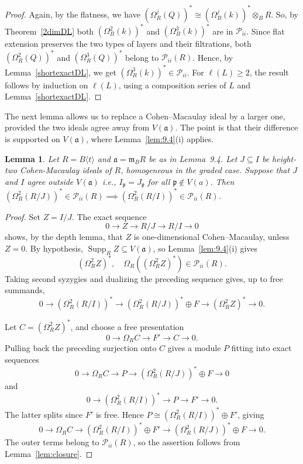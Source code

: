 \documentclass[11pt,letterpaper]{amsart}
\theoremstyle{plain}
\newtheorem{lem}[thm]{Lemma}
\theoremstyle{definition}
\theoremstyle{remark}
\begin{document}
\begin{proof}
Again, by the flatness, we have $(\Omega_R^j(Q))^* \cong(\Omega_B^j(k))^*\otimes_B R$. So, by Theorem~\ref{2dimDL} both $(\Omega_B^2(k))^*$ and $(\Omega^3_B(k))^*$ are in $\mathcal{P}_{ii}$. Since flat extension preserves the two types of layers and their filtrations, both $(\Omega_R^2(Q))^*$ and $(\Omega_R^3(Q))^*$ belong to $\mathcal P_{ii}(R)$. Hence, by Lemma~\ref{shortexactDL}, we get $(\Omega^3_R(k))^*\in\mathcal{P}_{ii}$. For $\ell(L)\geq 2$, the result follows by induction on $\ell(L)$, using a composition series of $L$ and Lemma~\ref{shortexactDL}.
\end{proof}


The next lemma allows us to replace a Cohen--Macaulay
ideal by a larger one, provided the two ideals agree
away from $V(\mathfrak a)$. The point is that their
difference is supported on $V(\mathfrak a)$, where
Lemma~\ref{lem:9.4}(i) applies.

\begin{lem}\label{lem:passing-to-larger-ideal}
Let $R=B\langle t\rangle$ and $\mathfrak a=\mathfrak m_B R$ be as in Lemma~9.4. Let $J\subseteq I$ be height-two Cohen-Macaulay ideals of $R$, homogeneous in the graded case. Suppose that $J$ and $I$ agree outside $V(\mathfrak a)$ i.e., $I_\mathfrak p=J_\mathfrak p$ for all $\mathfrak p\notin V(a)$. Then $(\Omega_R^2(R/J))^*\in\mathcal P_{ii}(R)\implies(\Omega_R^2(R/I))^*\in\mathcal P_{ii}(R)$.
\end{lem}

\begin{proof}
Set $Z=I/J$. The exact sequence
\[
0\longrightarrow Z\longrightarrow R/J
\longrightarrow R/I\longrightarrow0
\]
shows, by the depth lemma, that $Z$ is one-dimensional Cohen--Macaulay, unless $Z=0$. By hypothesis, $\operatorname{Supp}_R Z \subseteq V(\mathfrak a)$, so Lemma~\ref{lem:9.4}(i) gives \[ (\Omega_R^2Z)^*,\quad  \Omega_R((\Omega_R^2Z)^*)\in\mathcal P_{ii}(R). \]
Taking second syzygies and dualizing the preceding sequence gives, up to free summands,
\[
0\longrightarrow(\Omega_R^2(R/I))^*
\longrightarrow(\Omega_R^2(R/J))^*\oplus F
\longrightarrow(\Omega_R^2Z)^*
\longrightarrow0.
\]

Let $C=(\Omega_R^2Z)^*$, and choose a free presentation
\[
0\longrightarrow\Omega_R C
\longrightarrow F'\longrightarrow C
\longrightarrow0.
\]
Pulling back the preceding surjection onto $C$ gives a module $P$ fitting into exact sequences
\[0\longrightarrow\Omega_R C \longrightarrow P \longrightarrow(\Omega_R^2(R/J))^*\oplus F \longrightarrow0 \]
and \[ 0\longrightarrow(\Omega_R^2(R/I))^* \longrightarrow P\longrightarrow F' \longrightarrow0. \]
The latter splits since $F'$ is free. Hence $P\cong(\Omega_R^2(R/I))^*\oplus F'$, giving
\[ 0\longrightarrow\Omega_R C \longrightarrow(\Omega_R^2(R/I))^*\oplus F' \longrightarrow(\Omega_R^2(R/J))^*\oplus F \longrightarrow0.
\]
 The outer terms belong to $\mathcal P_{ii}(R)$, so the assertion follows from Lemma~\ref{lem:closure}.
\end{proof}
\end{document}

